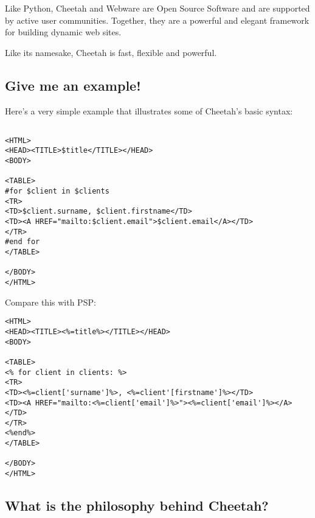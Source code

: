 Like Python, Cheetah and Webware are Open Source Software and are supported by
active user communities.  Together, they are a powerful and elegant framework
for building dynamic web sites. 

Like its namesake, Cheetah is fast, flexible and powerful.

\subsection{Give me an example!}
\label{intro.whatIs}

Here's a very simple example that illustrates some of Cheetah's basic syntax:

\begin{verbatim}

<HTML>
<HEAD><TITLE>$title</TITLE></HEAD>
<BODY>

<TABLE>
#for $client in $clients
<TR>
<TD>$client.surname, $client.firstname</TD>
<TD><A HREF="mailto:$client.email">$client.email</A></TD>
</TR>
#end for
</TABLE>

</BODY>
</HTML>
\end{verbatim}

Compare this with PSP:

\begin{verbatim}
<HTML>
<HEAD><TITLE><%=title%></TITLE></HEAD>
<BODY>

<TABLE>
<% for client in clients: %>
<TR>
<TD><%=client['surname']%>, <%=client'[firstname']%></TD>
<TD><A HREF="mailto:<%=client['email']%>"><%=client['email']%></A></TD>
</TR>
<%end%>
</TABLE>

</BODY>
</HTML>
\end{verbatim}



\subsection{What is the philosophy behind Cheetah?}
\label{intro.philosophy}

